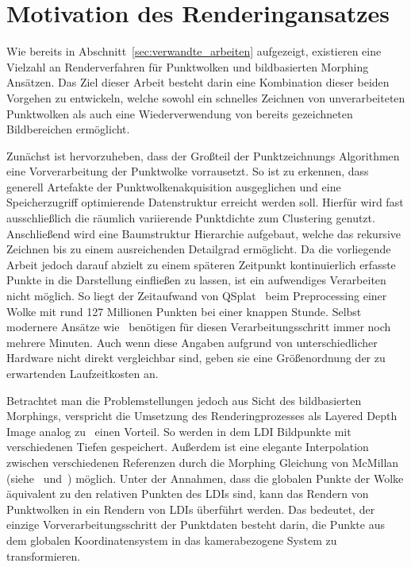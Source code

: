 \documentclass[hyperref, beleg, german]{cgvpub}
\begin{document}
\section{Motivation des Renderingansatzes}

Wie bereits in Abschnitt~\ref{sec:verwandte_arbeiten} aufgezeigt, existieren
eine Vielzahl an Renderverfahren für Punktwolken und bildbasierten Morphing
Ansätzen. Das Ziel dieser Arbeit besteht darin eine Kombination dieser beiden
Vorgehen zu entwickeln, welche sowohl ein schnelles Zeichnen von
unverarbeiteten Punktwolken als auch eine Wiederverwendung von bereits
gezeichneten Bildbereichen ermöglicht.

Zunächst ist hervorzuheben, dass der Großteil der Punktzeichnungs Algorithmen
eine Vorverarbeitung der Punktwolke vorrausetzt. So ist zu erkennen, dass
generell Artefakte der Punktwolkenakquisition ausgeglichen und eine
Speicherzugriff optimierende Datenstruktur erreicht werden soll. Hierfür wird
fast ausschließlich die räumlich variierende Punktdichte zum Clustering
genutzt. Anschließend wird eine Baumstruktur Hierarchie aufgebaut, welche das
rekursive Zeichnen bis zu einem ausreichenden Detailgrad ermöglicht. Da die
vorliegende Arbeit jedoch darauf abzielt zu einem späteren Zeitpunkt
kontinuierlich erfasste Punkte in die Darstellung einfließen zu lassen, ist ein
aufwendiges Verarbeiten nicht möglich. So liegt der Zeitaufwand von
QSplat~\cite{rusinkiewicz2000qsplat} beim Preprocessing einer Wolke mit rund
127 Millionen Punkten bei einer knappen Stunde. Selbst modernere Ansätze
wie~\cite{goswami2010high} benötigen für diesen Verarbeitungsschritt immer noch
mehrere Minuten. Auch wenn diese Angaben aufgrund von unterschiedlicher
Hardware nicht direkt vergleichbar sind, geben sie eine Größenordnung der zu
erwartenden Laufzeitkosten an.

Betrachtet man die Problemstellungen jedoch aus Sicht des bildbasierten
Morphings, verspricht die Umsetzung des Renderingprozesses als Layered Depth
Image analog zu~\cite{chang1999ldi} einen Vorteil. So werden in dem LDI
Bildpunkte mit verschiedenen Tiefen gespeichert. Außerdem ist eine elegante
Interpolation zwischen verschiedenen Referenzen durch die Morphing Gleichung
von McMillan (siehe~\cite{mcmillan1995list} und~\cite{mcmillan1995plenoptic})
möglich. Unter der Annahmen, dass die globalen Punkte der Wolke äquivalent zu
den relativen Punkten des LDIs sind, kann das Rendern von Punktwolken in ein
Rendern von LDIs überführt werden. Das bedeutet, der einzige
Vorverarbeitungsschritt der Punktdaten besteht darin, die Punkte aus dem
globalen Koordinatensystem in das kamerabezogene System zu transformieren.
\end{document}
